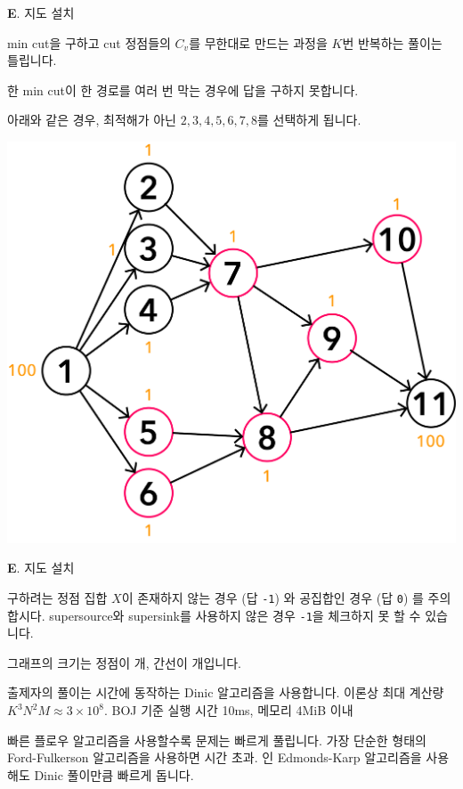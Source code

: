 \begin{frame}{\textbf{E}. 지도 설치}

    min cut을 구하고 cut 정점들의 $C_v$를 무한대로 만드는 과정을 $K$번 반복하는 풀이는 틀립니다.
    
    한 min cut이 한 경로를 여러 번 막는 경우에 답을 구하지 못합니다.
    
    \vspace{0.5 \baselineskip}
    
    아래와 같은 경우, 최적해가 아닌 ${2, 3, 4, 5, 6, 7, 8}$를 선택하게 됩니다.
    
    \begin{center}
        \includegraphics[width=0.30\linewidth]{../images/setting-maps/maps_sol_3.png}
    \end{center}
    
\end{frame}


\begin{frame}{\textbf{E}. 지도 설치}

    구하려는 정점 집합 $X$이 존재하지 않는 경우 (답 \texttt{-1}) 와 공집합인 경우 (답 \texttt{0}) 를 주의합시다. \newline
    supersource와 supersink를 사용하지 않은 경우 \texttt{-1}을 체크하지 못 할 수 있습니다.
    
    \vspace{0.5 \baselineskip}

    그래프의 크기는 정점이 개, 간선이 개입니다.
    
    \vspace{0.5 \baselineskip}
    
    출제자의 풀이는  시간에 동작하는 Dinic 알고리즘을 사용합니다. \newline
    이론상 최대 계산량 $K^3 N^2 M \approx 3 \times 10^8$. BOJ 기준 실행 시간 10ms, 메모리 4MiB 이내
    
    \vspace{0.5 \baselineskip}
    
    빠른 플로우 알고리즘을 사용할수록 문제는 빠르게 풀립니다. \newline
    가장 단순한 형태의 Ford-Fulkerson 알고리즘을 사용하면 시간 초과. \newline
    인 Edmonds-Karp 알고리즘을 사용해도 Dinic 풀이만큼 빠르게 돕니다.
    
\end{frame}